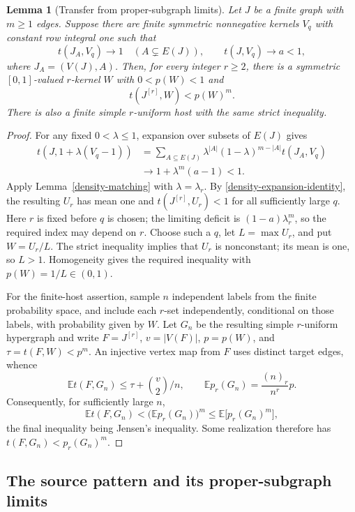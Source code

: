 \documentclass[a4paper,11pt,reqno]{amsart}
\theoremstyle{plain}
\newtheorem{lemma}[theorem]{Lemma}
\theoremstyle{definition}
\theoremstyle{remark}
\begin{document}
\begin{lemma}[Transfer from proper-subgraph limits]
\label{density-transfer}
Let $J$ be a finite graph with $m\ge1$ edges.
Suppose there are finite symmetric nonnegative kernels $V_q$ with
constant row integral one such that
\[
 t(J_A,V_q)\longrightarrow1\quad(A\subsetneq E(J)),\qquad
 t(J,V_q)\longrightarrow a<1,
\]
where $J_A=(V(J),A)$.
Then, for every integer $r\ge2$, there is a symmetric
$[0,1]$-valued $r$-kernel $W$ with $0<p(W)<1$ and
\[
 t(J^{[r]},W)<p(W)^m.
\]
There is also a finite simple $r$-uniform host with the same strict
inequality.
\end{lemma}
\begin{proof}
For any fixed $0<\lambda\le1$, expansion over subsets of $E(J)$ gives
\begin{align*}
 t(J,1+\lambda(V_q-1))
 &=\sum_{A\subseteq E(J)}
       \lambda^{|A|}(1-\lambda)^{m-|A|}t(J_A,V_q)\\
 &\longrightarrow 1+\lambda^m(a-1)<1.
\end{align*}
Apply Lemma~\ref{density-matching} with $\lambda=\lambda_r$.
By \eqref{density-expansion-identity}, the resulting $U_r$ has mean
one and $t(J^{[r]},U_r)<1$ for all sufficiently large $q$.
Here $r$ is fixed before $q$ is chosen; the limiting deficit is
$(1-a)\lambda_r^m$, so the required index may depend on $r$.
Choose such a $q$, let $L=\max U_r$, and put $W=U_r/L$.
The strict inequality implies that $U_r$ is nonconstant; its mean is
one, so $L>1$.  Homogeneity gives the required inequality with
$p(W)=1/L\in(0,1)$.

For the finite-host assertion, sample $n$ independent labels from the
finite probability space, and include each $r$-set independently,
conditional on those labels, with probability given by $W$.
Let $G_n$ be the resulting simple $r$-uniform hypergraph and write
$F=J^{[r]}$, $v=|V(F)|$, $p=p(W)$, and $\tau=t(F,W)<p^m$.
An injective vertex map from $F$ uses distinct target edges, whence
\[
 \mathbb E t(F,G_n)\le \tau+\binom v2/n,\qquad
 \mathbb E p_r(G_n)=\frac{(n)_r}{n^r}p.
 \]
Consequently, for sufficiently large $n$,
\[
 \mathbb E t(F,G_n)<\bigl(\mathbb E p_r(G_n)\bigr)^m
             \le \mathbb E\bigl[p_r(G_n)^m\bigr],
\]
the final inequality being Jensen's inequality.
Some realization therefore has $t(F,G_n)<p_r(G_n)^m$.
\end{proof}

\subsection{The source pattern and its proper-subgraph limits}
\end{document}
